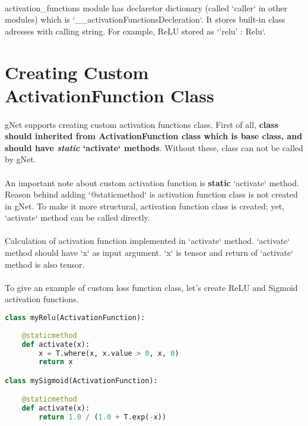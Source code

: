 \documentclass[12pt]{report}
\begin{document}
\paragraph{}
activation\_functions module has declaretor dictionary (called `caller` in other modules) which is `\_\_activationFunctionsDecleration`. It stores built-in class adresses with calling string. For example, ReLU stored as `'relu' : Relu`. 

\section{Creating Custom ActivationFunction Class}

\paragraph{}
gNet supports creating custom activation functions class. First of all, \textbf{class should inherited from ActivationFunction class which is base class, and should have \textit{static} `activate` methods}. Without these, class can not be called by gNet. 

\paragraph{}
An important note about custom activation function is \textbf{static} `activate` method. Reason behind adding `@staticmethod` is activation function class is not created in gNet. To make it more structural, activation function class is created; yet, `activate` method can be called directly. 

\paragraph{}
Calculation of activation function implemented in `activate` method. `activate` method should have `x` as input argument. `x` is tensor and return of `activate` method is also tensor. 

\paragraph{}
To give an example of custom loss function class, let's create ReLU and Sigmoid activation functions.


\begin{lstlisting}[language=Python, numbers=none, caption={Custom activation function classes.}, label={lis:activation-function-custom-class}]
class myRelu(ActivationFunction):
  
	@staticmethod
	def activate(x):  
		x = T.where(x, x.value > 0, x, 0)
		return x

class mySigmoid(ActivationFunction):

	@staticmethod
	def activate(x):
		return 1.0 / (1.0 + T.exp(-x))

\end{lstlisting}
\end{document}
